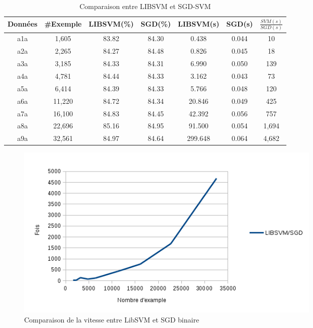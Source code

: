 \begin{table}
\begin{center}
    \begin{tabular}{ | c | c | c | c | c | c | c |}
    \hline
    Données & \#Exemple & LIBSVM(\%) & SGD(\%) & LIBSVM(s) & SGD(s) & $\frac{SVM(s)}{SGD(s)}$ \\ \hline
    
    a1a & 1,605 & 83.82 & 84.30 & 0.438 & 0.044 & 10 \\ \hline
    
    a2a & 2,265 & 84.27 & 84.48 & 0.826 & 0.045 & 18 \\ \hline
    
    a3a & 3,185 & 84.33 & 84.31 & 6.990 & 0.050 & 139 \\ \hline
    
    a4a & 4,781 & 84.44 & 84.33 & 3.162 & 0.043 & 73 \\ \hline
    
    a5a & 6,414 & 84.39 & 84.33 & 5.766 & 0.048 & 120 \\ \hline
    
    a6a & 11,220 & 84.72 & 84.34 & 20.846 & 0.049 & 425 \\ \hline
    
    a7a & 16,100 & 84.83 & 84.45 & 42.392 & 0.056 & 757 \\ \hline
    
    a8a & 22,696 & 85.16 & 84.95 & 91.500 & 0.054 & 1,694 \\ \hline
    
    a9a & 32,561 & 84.97 & 84.64 & 299.648 & 0.064 & 4,682 \\ \hline
    
    \end{tabular}
\end{center}
\caption{Comparaison entre LIBSVM et SGD-SVM}
\label{tab:svmsgd}
\end{table}

\begin{figure}[ht!]
\centering
\includegraphics[width=150mm]{images/res}
\caption{Comparaison de la vitesse entre LibSVM et SGD binaire}
\label{fig:res}
\end{figure}


